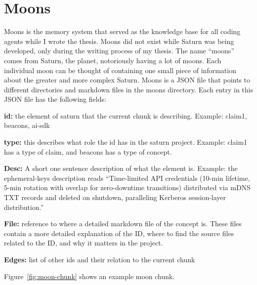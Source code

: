 \section{Moons}

Moons is the memory system that served as the knowledge base for all coding agents while I wrote the thesis. Moons did not exist while Saturn was being developed, only during the writing process of my thesis. The name ``moons'' comes from Saturn, the planet, notoriously having a lot of moons. Each individual moon can be thought of containing one small piece of information about the greater and more complex Saturn. Moons is a JSON file that points to different directories and markdown files in the moons directory. Each entry in this JSON file has the following fields:

\textbf{id:} the element of saturn that the current chunk is describing. Example: claim1, beacons, ai-sdk

\textbf{type:} this describes what role the id has in the saturn project. Example: claim1 has a type of claim, and beacons has a type of concept.

\textbf{Desc:} A short one sentence description of what the element is. Example: the ephemeral-keys description reads ``Time-limited API credentials (10-min lifetime, 5-min rotation with overlap for zero-downtime transitions) distributed via mDNS TXT records and deleted on shutdown, paralleling Kerberos session-layer distribution.''

\textbf{File:} reference to where a detailed markdown file of the concept is. These files contain a more detailed explanation of the ID, where to find the source files related to the ID, and why it matters in the project.

\textbf{Edges:} list of other ids and their relation to the current chunk

Figure~\ref{fig:moon-chunk} shows an example moon chunk.

